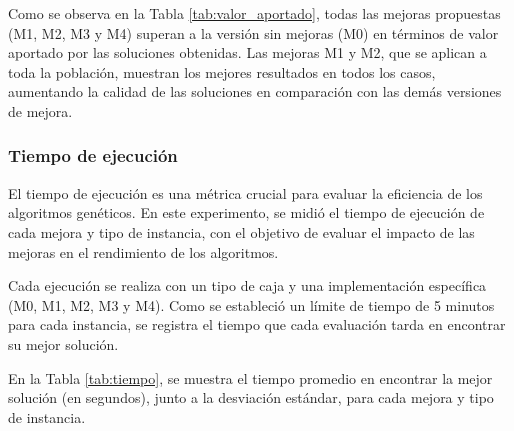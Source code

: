 Como se observa en la Tabla \ref{tab:valor_aportado}, todas las mejoras propuestas (M1, M2, M3 y M4) superan a la versión sin mejoras (M0) en términos de valor aportado por las soluciones obtenidas. Las mejoras M1 y M2, que se aplican a toda la población, muestran los mejores resultados en todos los casos, aumentando la calidad de las soluciones en comparación con las demás versiones de mejora.

\subsubsection{Tiempo de ejecución}

El tiempo de ejecución es una métrica crucial para evaluar la eficiencia de los algoritmos genéticos. En este experimento, se midió el tiempo de ejecución de cada mejora y tipo de instancia, con el objetivo de evaluar el impacto de las mejoras en el rendimiento de los algoritmos.

Cada ejecución se realiza con un tipo de caja y una implementación específica (M0, M1, M2, M3 y M4). Como se estableció un límite de tiempo de 5 minutos para cada instancia, se registra el tiempo que cada evaluación tarda en encontrar su mejor solución.

En la Tabla \ref{tab:tiempo}, se muestra el tiempo promedio en encontrar la mejor solución (en segundos), junto a la desviación estándar, para cada mejora y tipo de instancia.


